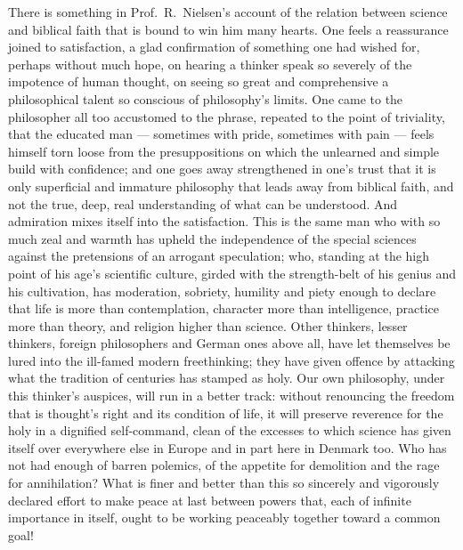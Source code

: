 \documentclass[12pt,a4paper]{book}
\newcommand{\opage}[1]{\marginnote{\footnotesize\textit{[#1]}}}
\begin{document}
\opage{7}There is something in Prof.\ R.\ Nielsen's account of the relation
between science and biblical faith that is bound to win him many hearts. One
feels a reassurance joined to satisfaction, a glad confirmation of something
one had wished for, perhaps without much hope, on hearing a thinker speak so
severely of the impotence of human thought, on seeing so great and
comprehensive a philosophical talent so conscious of philosophy's limits. One
came to the philosopher all too accustomed to the phrase, repeated to the point
of triviality, that the educated man --- sometimes with pride, sometimes with
pain --- feels himself torn loose from the presuppositions on which the
unlearned and simple build with confidence; and one goes away strengthened in
one's trust that it is only superficial and immature philosophy that leads away
from biblical faith, and not the true, deep, real understanding of what can be
understood. And admiration mixes itself into the satisfaction. This is the same
man who with so much zeal and warmth has upheld the independence of the special
\opage{8}sciences against the pretensions of an arrogant speculation; who,
standing at the high point of his age's scientific culture, girded with the
strength-belt of his genius and his cultivation, has moderation, sobriety,
humility and piety enough to declare that life is more than contemplation,
character more than intelligence, practice more than theory, and religion
higher than science. Other thinkers, lesser thinkers, foreign philosophers and
German ones above all, have let themselves be lured into the ill-famed modern
freethinking; they have given offence by attacking what the tradition of
centuries has stamped as holy. Our own philosophy, under this thinker's
auspices, will run in a better track: without renouncing the freedom that is
thought's right and its condition of life, it will preserve reverence for the
holy in a dignified self-command, clean of the excesses to which science has
given itself over everywhere else in Europe and in part here in Denmark too.
Who has not had enough of barren polemics, of the appetite for demolition and
the rage for annihilation? What is finer and better than this so sincerely and
vigorously declared effort to make peace at last between powers that, each of
infinite importance in itself, ought to be working peaceably together toward a
common goal!
\end{document}
